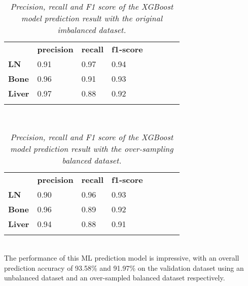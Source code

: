 \documentclass[12pt,a4paper]{report}
\begin{document}
\begin{table}[]
\centering
\begin{tabular}{llllllll}
\cline{1-4}
\multicolumn{1}{|l|}{} & \multicolumn{1}{l|}{\textbf{precision}} & \multicolumn{1}{l|}{\textbf{recall}} & \multicolumn{1}{l|}{\textbf{f1-score}} &  &  &  &  \\ \cline{1-4}
\multicolumn{1}{|l|}{\textbf{LN}} & \multicolumn{1}{l|}{0.91} & \multicolumn{1}{l|}{0.97} & \multicolumn{1}{l|}{0.94} &  &  &  &  \\ \cline{1-4}
\multicolumn{1}{|l|}{\textbf{Bone}} & \multicolumn{1}{l|}{0.96} & \multicolumn{1}{l|}{0.91} & \multicolumn{1}{l|}{0.93} &  &  &  &  \\ \cline{1-4}
\multicolumn{1}{|l|}{\textbf{Liver}} & \multicolumn{1}{l|}{0.97} & \multicolumn{1}{l|}{0.88} & \multicolumn{1}{l|}{0.92} &  &  &  &  \\ \cline{1-4}
 &  &  &  &  &  &  & 
\end{tabular}
\caption{\textit{Precision, recall and F1 score of the XGBoost model prediction result with the original imbalanced dataset.}}
\label{tab:oritable}
\end{table}\\

\begin{table}[]
\centering
\begin{tabular}{llllllll}
\cline{1-4}
\multicolumn{1}{|l|}{} & \multicolumn{1}{l|}{\textbf{precision}} & \multicolumn{1}{l|}{\textbf{recall}} & \multicolumn{1}{l|}{\textbf{f1-score}} &  &  &  &  \\ \cline{1-4}
\multicolumn{1}{|l|}{\textbf{LN}} & \multicolumn{1}{l|}{0.90} & \multicolumn{1}{l|}{0.96} & \multicolumn{1}{l|}{0.93} &  &  &  &  \\ \cline{1-4}
\multicolumn{1}{|l|}{\textbf{Bone}} & \multicolumn{1}{l|}{0.96} & \multicolumn{1}{l|}{0.89} & \multicolumn{1}{l|}{0.92} &  &  &  &  \\ \cline{1-4}
\multicolumn{1}{|l|}{\textbf{Liver}} & \multicolumn{1}{l|}{0.94} & \multicolumn{1}{l|}{0.88} & \multicolumn{1}{l|}{0.91} &  &  &  &  \\ \cline{1-4}
 &  &  &  &  &  &  & 
\end{tabular}
\caption{\textit{Precision, recall and F1 score of the XGBoost model prediction result with the over-sampling balanced dataset.}}
\label{tab:baltable}
\end{table}\\


The performance of this ML prediction model is impressive, with an overall prediction accuracy of 93.58\% and 91.97\% on the validation dataset using an unbalanced dataset and an over-sampled balanced dataset respectively.\\
\end{document}
